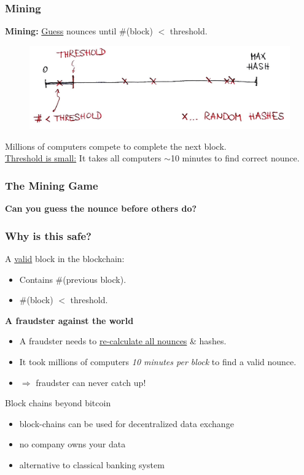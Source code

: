 \documentclass[12pt]{beamer}
\theoremstyle{definition}
\numberwithin{equation}{section}
\begin{document}
\begin{frame}
\frametitle{Mining}
\textbf{Mining:} \underline{Guess} nounces until \#(block) $<$ threshold.

\begin{figure}
\includegraphics[scale=0.28, trim = {30mm 0mm 0mm 0mm}]{fig5}
\end{figure}
Millions of computers compete to complete the next block.\\
\underline{Threshold is small:} It takes all computers $\sim$10 minutes to find correct nounce.
\end{frame}

\begin{frame}
\frametitle{The Mining Game}
\textbf{Can you guess the nounce before others do?}
\end{frame}

\begin{frame}
\frametitle{Why is this safe?}
A \underline{valid} block in the blockchain:
\begin{itemize}
\item Contains \#(previous block).
\item \#(block) $<$ threshold.
\end{itemize}
\bigskip

\textbf{A fraudster against the world}
\begin{itemize}
\item A fraudster needs to \underline{re-calculate all nounces} \& hashes.
\item It took millions of computers \emph{10 minutes per block} to find a valid nounce.
\item $\Rightarrow$ fraudster can never catch up!
\end{itemize}
\end{frame}

\begin{frame}{Block chains beyond bitcoin}
  \begin{itemize}
    \item block-chains can be used for decentralized data exchange\\[1ex]
    \item no company owns your data\\[1ex]
    \item alternative to classical banking system
  \end{itemize}

\end{frame}
\end{document}
